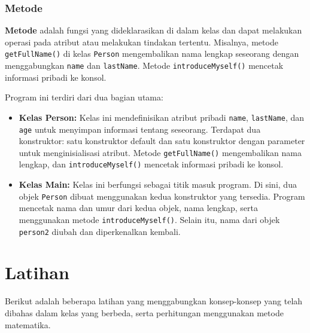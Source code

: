 \subsubsection{Metode}

\textbf{Metode} adalah fungsi yang dideklarasikan di dalam kelas dan dapat melakukan operasi pada atribut atau melakukan tindakan tertentu. Misalnya, metode \texttt{getFullName()} di kelas \texttt{Person} mengembalikan nama lengkap seseorang dengan menggabungkan \texttt{name} dan \texttt{lastName}. Metode \texttt{introduceMyself()} mencetak informasi pribadi ke konsol.

Program ini terdiri dari dua bagian utama:

\begin{itemize}
\item \textbf{Kelas Person:} Kelas ini mendefinisikan atribut pribadi \texttt{name}, \texttt{lastName}, dan \texttt{age} untuk menyimpan informasi tentang seseorang. Terdapat dua konstruktor: satu konstruktor default dan satu konstruktor dengan parameter untuk menginisialisasi atribut. Metode \texttt{getFullName()} mengembalikan nama lengkap, dan \texttt{introduceMyself()} mencetak informasi pribadi ke konsol.
\item \textbf{Kelas Main:} Kelas ini berfungsi sebagai titik masuk program. Di sini, dua objek \texttt{Person} dibuat menggunakan kedua konstruktor yang tersedia. Program mencetak nama dan umur dari kedua objek, nama lengkap, serta menggunakan metode \texttt{introduceMyself()}. Selain itu, nama dari objek \texttt{person2} diubah dan diperkenalkan kembali.
\end{itemize}

\section{Latihan}

Berikut adalah beberapa latihan yang menggabungkan konsep-konsep yang telah dibahas dalam kelas yang berbeda, serta perhitungan menggunakan metode matematika.

